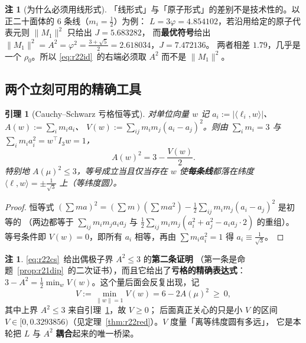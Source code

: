 \documentclass[UTF8,11pt]{ctexart}
\newtheorem{lemma}[theorem]{引理}
\theoremstyle{definition}
\newtheorem{remark}[theorem]{注}
\begin{document}
\begin{remark}[为什么必须用线形式]\label{rem:r22line}
「线形式」与「原子形式」的差别不是技术性的。以正二十面体的 $6$ 条线（$m_i=\frac12$）为例：
$L=3\varphi=4.854102$，若沿用给定的原子代表元则 $\|M_1\|^2$ 只给出 $J=5.683282$，
而\textbf{最优符号}给出 $\|M_1\|^2=A^2=\varphi^2=\frac{3+\sqrt5}2=2.618034$，$J=7.472136$。
两者相差 $1.79$，几乎是一个 $\rho_0$。所以 \eqref{eq:r22id}~的右端必须取 $A^2$ 而不是 $\|M_1\|^2$。
\end{remark}

\subsection{两个立刻可用的精确工具}\label{sec:r22:cs}

\begin{lemma}[Cauchy--Schwarz 亏格恒等式]\label{lem:r22cs}
对单位向量 $w$ 记 $a_i:=|\langle\ell_i,w\rangle|$、$A(w):=\sum_im_ia_i$、
$V(w):=\sum_{ij}m_im_j(a_i-a_j)^2$。则由 $\sum_im_i=3$ 与 $\sum_im_ia_i^2=w^\top I_3w=1$，
\begin{equation}\label{eq:r22cs}
A(w)^2=3-\frac{V(w)}2 .
\end{equation}
特别地 $A(\mu)^2\le3$，等号成立当且仅当存在 $w$ 使\textbf{每条线}都落在纬度
$\langle\ell,w\rangle=\pm\frac1{\sqrt3}$ 上（等纬度圆）。
\end{lemma}

\begin{proof}
恒等式 $(\sum m a)^2=(\sum m)(\sum ma^2)-\frac12\sum_{ij}m_im_j(a_i-a_j)^2$ 是初等的
（两边都等于 $\sum_{ij}m_im_ja_ia_j$ 与 $\frac12\sum_{ij}m_im_j(a_i^2+a_j^2-a_ia_j\cdot2)$ 的重组）。
等号条件即 $V(w)=0$，即所有 $a_i$ 相等，再由 $\sum m_ia_i^2=1$ 得 $a_i\equiv\frac1{\sqrt3}$。
\end{proof}

\begin{remark}
\eqref{eq:r22cs}~给出偶极子界 $A^2\le3$ 的\textbf{第二条证明}
（第一条是命题~\ref{prop:r21dip}~的二次证书），而且它给出了\textbf{亏格的精确表达式}：
$3-A^2=\frac12\min_wV(w)$。这个量后面会反复出现，记
\begin{equation}\label{eq:r22Vdef}
V:=\min_{\|w\|=1}V(w)=6-2A(\mu)^2\ \ge\ 0,
\end{equation}
其中上界 $A^2\le3$ 来自引理~\ref{lem:r22cs}，故 $V\ge0$；
后面真正关心的只是小 $V$ 的区间 $V\in[0,0.3293856)$（见定理~\ref{thm:r22red}）。$V$ 度量「离等纬度圆有多远」，
它是本轮把 $L$ 与 $A^2$ \textbf{耦合}起来的唯一桥梁。
\end{remark}
\end{document}
